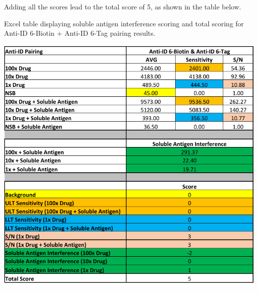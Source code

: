 Adding all the scores lead to the total score of 5, as shown in the table below.

\begin{table}[ht]
 \centering
 \caption{Excel table displaying soluble antigen interference scoring and total scoring for Anti-ID 6-Biotin + Anti-ID 6-Tag pairing results.}
 \includegraphics{graphics/ch3/Table_7.pdf}
\end{table} 

